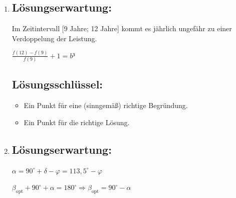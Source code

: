 \begin{langesbeispiel}
{\begin{enumerate}
$\frac{f(13)-f(0)}{13}\approx 46,8$

Im Zeitraum von 2000 bis 2013 hat die Leistung durchschnittlich um ca. 47 MW pro Jahr zugenommen.\leer
 
Das Integral gibt näherungsweise an, wie viel elektrische Energie ("`Sonnenstrom"') in den Jahren 2000 bis 2013 mithilfe von Solarzellen insgesamt erzeugt wurde.

	\subsection{Lösungsschlüssel:}
	\begin{itemize}
		\item Ein Ausgleichspunkt für die richtige Lösung und eine (sinngemäß) korrekte Interpretation.  
		
		Toleranzintervall: $[46 $MW$; 47 $MW$]$
		\item Ein Punkt für eine (sinngemäß) korrekte Interpretation.
	\end{itemize}
	
	\item \subsection{Lösungserwartung:}
			
Im Zeitintervall [9 Jahre; 12 Jahre] kommt es jährlich ungefähr zu einer Verdoppelung der Leistung.

$\frac{f(12)-f(9)}{f(9)}+1=b³$
	
	\subsection{Lösungsschlüssel:}
	
\begin{itemize}
	\item Ein Punkt für eine (sinngemäß) richtige Begründung. 
	\item Ein Punkt für die richtige Lösung. 
\end{itemize}

\item \subsection{Lösungserwartung:}
			
$\alpha=90^\circ+\delta-\varphi=113,5^\circ-\varphi$

$\beta_\text{opt}+90^\circ+\alpha=180^\circ \Rightarrow \beta_\text{opt}=90^\circ-\alpha$\leer


\end{enumerate}}
\end{langesbeispiel}
